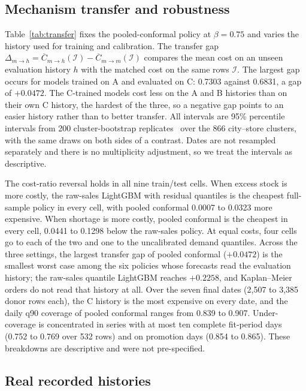 \subsection{Mechanism transfer and robustness}
\label{sec:transfer}

Table~\ref{tab:transfer} fixes the pooled-conformal policy at $\beta=0.75$ and varies the history used for training and calibration. The transfer gap $\Delta_{m\to h}=\overline{C}_{m\to h}(\mathcal I)-\overline{C}_{m\to m}(\mathcal I)$ compares the mean cost on an unseen evaluation history $h$ with the matched cost on the same rows $\mathcal I$. The largest gap occurs for models trained on A and evaluated on C: 0.7303 against 0.6831, a gap of $+0.0472$. The C-trained models cost less on the A and B histories than on their own C history, the hardest of the three, so a negative gap points to an easier history rather than to better transfer. All intervals are 95\% percentile intervals from 200 cluster-bootstrap replicates~\cite{efron1979bootstrap} over the 866 city--store clusters, with the same draws on both sides of a contrast. Dates are not resampled separately and there is no multiplicity adjustment, so we treat the intervals as descriptive.

The cost-ratio reversal holds in all nine train/test cells. When excess stock is more costly, the raw-sales LightGBM with residual quantiles is the cheapest full-sample policy in every cell, with pooled conformal 0.0007 to 0.0323 more expensive. When shortage is more costly, pooled conformal is the cheapest in every cell, 0.0441 to 0.1298 below the raw-sales policy. At equal costs, four cells go to each of the two and one to the uncalibrated demand quantiles. Across the three settings, the largest transfer gap of pooled conformal ($+0.0472$) is the smallest worst case among the six policies whose forecasts read the evaluation history; the raw-sales quantile LightGBM reaches $+0.2258$, and Kaplan--Meier orders do not read that history at all. Over the seven final dates (2,507 to 3,385 donor rows each), the C history is the most expensive on every date, and the daily q90 coverage of pooled conformal ranges from 0.839 to 0.907. Under-coverage is concentrated in series with at most ten complete fit-period days (0.752 to 0.769 over 532 rows) and on promotion days (0.854 to 0.865). These breakdowns are descriptive and were not pre-specified.

\subsection{Real recorded histories}
\label{sec:real}

